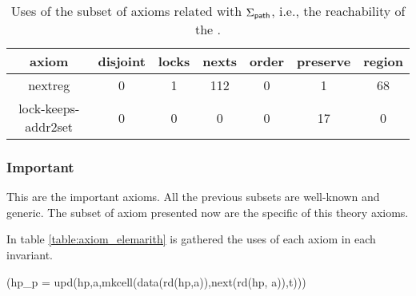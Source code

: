 	\begin{table}
        \centering
        \begin{tabular}{c|cccccc}
        axiom & disjoint & locks & nexts & order & preserve & region 
        \\\hline
                nextreg & 0 & 1 & 112 & 0 & 1 & 68 
                \\
                lock-keeps-addr2set & 0 & 0 & 0 & 0 & 17 & 0 
                \\
        \end{tabular}
	\label{table:axiom_addr2set}
	\caption{Uses of the subset of axioms related with $\Sigma_{\mathsf{path}}$, i.e., the reachability of the \addr.}
	\end{table}


\subsubsection{Important}


	This are the important axioms. 
	All the previous subsets are well-known and generic. 
	The subset of axiom presented now are the specific of this theory axioms.
	

	In table \ref{table:axiom_elemarith} is gathered the uses of each axiom in each invariant. 


	\begin{axiomdescription}
		\label{ax::lock_keeps_heap__data}\label{ax::lock_keeps_heap__next}
		\begin{formula}
			(hp_p = upd(hp,a,mkcell(data(rd(hp,a)),next(rd(hp,	a)),t))) \implies [data(r(hp,a)) = data(rd(hp_p,a)) \andcond next(r(hp,a)) = next(rd(hp_p,a)) ]
		\end{formula}
	\end{axiomdescription}


